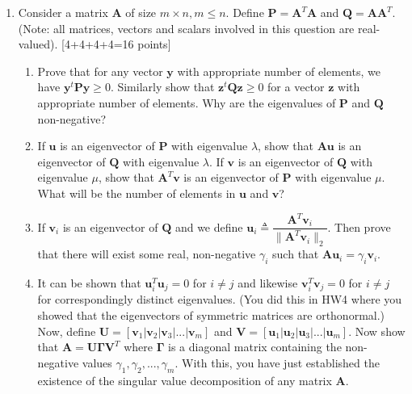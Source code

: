 \documentclass[11pt]{article}
\begin{document}
\begin{enumerate}
\begin{enumerate}
        \item Consider a matrix $\boldsymbol{A}$ of size $m \times n, m \leq n$. Define $\boldsymbol{P} = \boldsymbol{A}^T \boldsymbol{A}$ and $\boldsymbol{Q} = \boldsymbol{A}\boldsymbol{A}^T$. (Note: all matrices, vectors and scalars involved in this question are real-valued). \textsf{[4+4+4+4=16 points]}
        \begin{enumerate}
            \item Prove that for any vector $\boldsymbol{y}$ with appropriate number of elements, we have $\boldsymbol{y}^t \boldsymbol{Py} \geq 0$. Similarly show that $\boldsymbol{z}^t \boldsymbol{Qz} \geq 0$ for a vector $\boldsymbol{z}$ with appropriate number of elements. Why are the eigenvalues of $\boldsymbol{P}$ and $\boldsymbol{Q}$ non-negative?
            \item If $\boldsymbol{u}$ is an eigenvector of $\boldsymbol{P}$ with eigenvalue $\lambda$, show that $\boldsymbol{Au}$ is an eigenvector of $\boldsymbol{Q}$ with eigenvalue $\lambda$. If $\boldsymbol{v}$ is an eigenvector of $\boldsymbol{Q}$ with eigenvalue $\mu$, show that $\boldsymbol{A}^T\boldsymbol{v}$ is an eigenvector of $\boldsymbol{P}$ with eigenvalue $\mu$. What will be the number of elements in $\boldsymbol{u}$ and $\boldsymbol{v}$?

            \item If $\boldsymbol{v}_i$ is an eigenvector of $\boldsymbol{Q}$ and we define $\boldsymbol{u}_i \triangleq \dfrac{\boldsymbol{A}^T \boldsymbol{v}_i}{\|\boldsymbol{A}^T \boldsymbol{v}_i\|_2}$. Then prove that there will exist some real, non-negative $\gamma_i$ such that $\boldsymbol{Au}_i = \gamma_i \boldsymbol{v}_i$.

            \item It can be shown that $\boldsymbol{u}^T_i \boldsymbol{u}_j = 0$ for $i \neq j$ and likewise $\boldsymbol{v}^T_i \boldsymbol{v}_j = 0$ for $i \neq j$ for correspondingly distinct eigenvalues. (You did this in HW4 where you showed that the eigenvectors of symmetric matrices are orthonormal.) Now, define $\boldsymbol{U} = [\boldsymbol{v}_1 | \boldsymbol{v}_2 | \boldsymbol{v}_3 | ...|\boldsymbol{v}_m]$ and $\boldsymbol{V} = [\boldsymbol{u}_1 | \boldsymbol{u}_2 | \boldsymbol{u}_3 | ... |\boldsymbol{u}_m]$. Now show that $\boldsymbol{A} = \boldsymbol{U} \boldsymbol{\Gamma} \boldsymbol{V}^T$ where $\boldsymbol{\Gamma}$ is a diagonal matrix containing the non-negative values $\gamma_1, \gamma_2, ..., \gamma_m$. With this, you have just established the existence of the singular value decomposition of any matrix $\boldsymbol{A}$. 
        \end{enumerate}
    \end{enumerate}



\end{enumerate}
\end{document}
